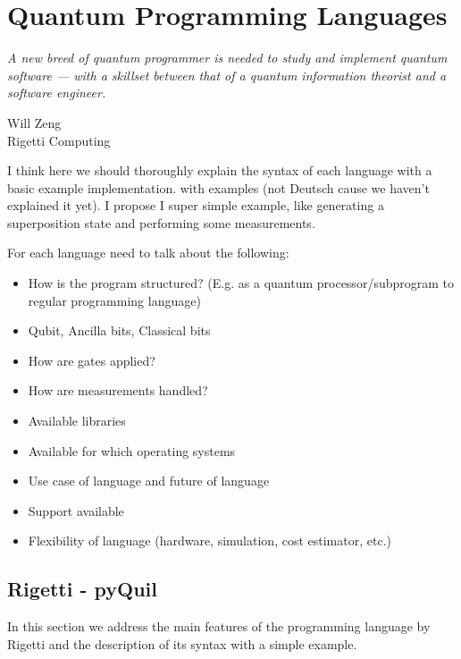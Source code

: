 \chapter{Quantum Programming Languages}
\label{QPL}

\epigraph{\textit{A new breed of quantum programmer is needed to study and implement quantum software — with a skillset between that of a quantum information theorist and a software engineer.}}{Will Zeng\\ Rigetti Computing \cite{WZ2017}}


I think here we should thoroughly explain the syntax of each language with a basic example implementation.  with examples (not Deutsch cause we haven't explained it yet). I propose I super simple example, like generating a superposition state and performing some measurements.

For each language need to talk about the following:
\begin{itemize}
\item How is the program structured? (E.g. as a quantum processor/subprogram to regular programming language)
\item Qubit, Ancilla bits, Classical bits
\item How are gates applied?
\item How are measurements handled?
\item Available libraries
\item Available for which operating systems
\item Use case of language and future of language
\item Support available
\item Flexibility of language (hardware, simulation, cost estimator, etc.)
\end{itemize} 

\section{Rigetti - pyQuil}

In this section we address the main features of the programming language by Rigetti and the description of its syntax with a simple example.

